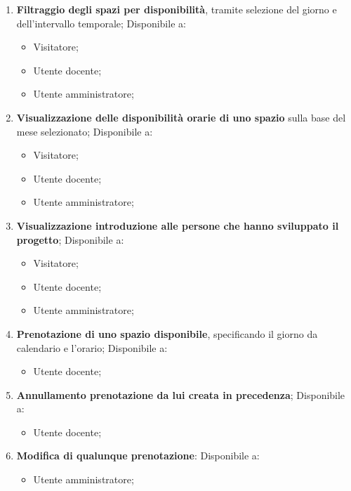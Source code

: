 \begin{enumerate}
    \item \textbf{Filtraggio degli spazi per disponibilità}, tramite selezione
    del giorno e dell'intervallo temporale; Disponibile a:
        \begin{itemize}
            \item Visitatore;
            \item Utente docente;
            \item Utente amministratore;
        \end{itemize}

    \item \textbf{Visualizzazione delle disponibilità orarie di uno spazio}
    sulla base del mese selezionato; Disponibile a:
    \begin{itemize}
            \item Visitatore; 
            \item Utente docente;
            \item Utente amministratore;
        \end{itemize}

    \item \textbf{Visualizzazione introduzione alle persone che hanno sviluppato
    il progetto}; Disponibile a:
        \begin{itemize}
            \item Visitatore;
            \item Utente docente;
            \item Utente amministratore;
        \end{itemize}

    \item \textbf{Prenotazione di uno spazio disponibile}, specificando il
    giorno da calendario e l'orario; Disponibile a:
        \begin{itemize}
            \item Utente docente;
        \end{itemize}

    \item \textbf{Annullamento prenotazione da lui creata in precedenza};
    Disponibile a:
        \begin{itemize}
            \item Utente docente;
        \end{itemize}

    \item \textbf{Modifica di qualunque prenotazione}: Disponibile a:
        \begin{itemize}
            \item Utente amministratore;
        \end{itemize}


\end{enumerate}
